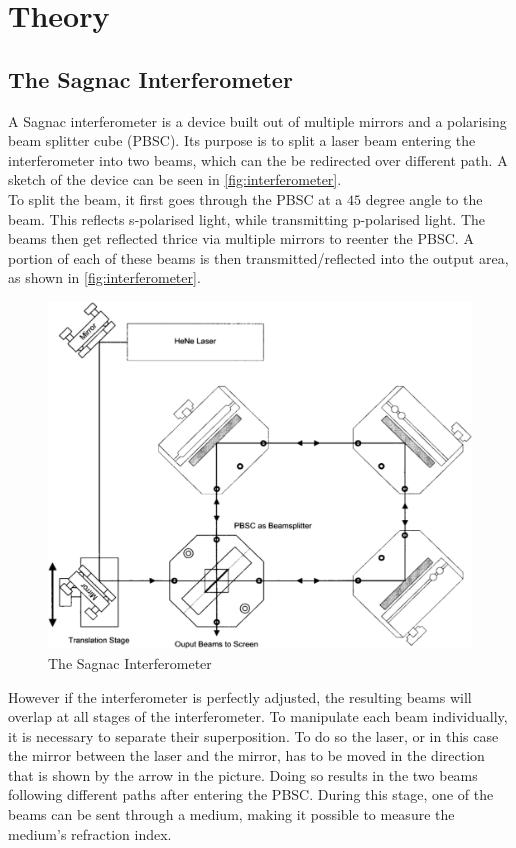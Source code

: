 \section{Theory}
\label{sec:Theory}
\subsection{The Sagnac Interferometer}
\label{sec:The_Sagnac_Interferometer}
A Sagnac interferometer is a device built out of multiple mirrors and a polarising beam splitter cube (PBSC). Its purpose is to split a laser beam entering the interferometer into two beams, which can the be redirected over different path. A sketch of the device can be seen in \autoref{fig:interferometer}.\\
To split the beam, it first goes through the PBSC at a $45$ degree angle to the beam. This reflects s-polarised light, while transmitting p-polarised light. The beams then get reflected thrice via multiple mirrors to reenter the PBSC. A portion of each of these beams is then transmitted/reflected into the output area, as shown in \autoref{fig:interferometer}.\\
\begin{figure}
\includegraphics[width=\linewidth]{./figures/aufbau.pdf}
\caption{The Sagnac Interferometer}
\label{fig:interferometer}
\end{figure}
However if the interferometer is perfectly adjusted, the resulting beams will overlap at all stages of the interferometer. To manipulate each beam individually, it is necessary to separate their superposition. To do so the laser, or in this case the mirror between the laser and the mirror, has to be moved in the direction that is shown by the arrow in the picture. Doing so results in the two beams following different paths after entering the PBSC. During this stage, one of the beams can be sent through a medium, making it possible to measure the medium's refraction index.
